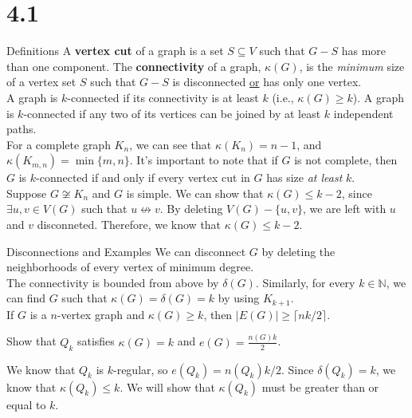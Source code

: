 \documentclass[10pt]{extarticle}
\begin{document}
  \section*{4.1}%
  \begin{problem}{Definitions}
    A \textbf{vertex cut} of a graph is a set $S\subseteq V$ such that $G-S$ has more than one component. The \textbf{connectivity} of a graph, $\kappa(G)$, is the \textit{minimum} size of a vertex set $S$ such that $G-S$ is disconnected \underline{or} has only one vertex.\\

    A graph is $k$-connected if its connectivity is at least $k$ (i.e., $\kappa(G) \geq k$). A graph is $k$-connected if any two of its vertices can be joined by at least $k$ independent paths.\\

    For a complete graph $K_n$, we can see that $\kappa(K_n) = n-1$, and $\kappa(K_{m,n}) = \min\{m,n\}$. It's important to note that if $G$ is not complete, then $G$ is $k$-connected if and only if every vertex cut in $G$ has size \textit{at least} $k$.\\

    Suppose $G \not\cong K_n$ and $G$ is simple. We can show that $\kappa(G) \leq k-2$, since $\exists u,v\in V(G)$ such that $u\not\leftrightarrow v$. By deleting $V(G) - \{u,v\}$, we are left with $u$ and $v$ disconneted. Therefore, we know that $\kappa(G) \leq k-2$.
  \end{problem}
  \begin{problem}{Disconnections and Examples}
    We can disconnect $G$ by deleting the neighborhoods of every vertex of minimum degree.\\

    The connectivity is bounded from above by $\delta(G)$. Similarly, for every $k\in \mathbb{N}$, we can find $G$ such that $\kappa(G) = \delta(G) = k$ by using $K_{k+1}$.\\

    If $G$ is a $n$-vertex graph and $\kappa(G) \geq k$, then $|E(G)| \geq \lceil nk/2\rceil$.\\

    \begin{description}[font=\scshape]
      \item[Ex.] Show that $Q_k$ satisfies $\kappa(G) = k$ and $e(G) = \frac{n(G)k}{2}$.
      \item[Proof] We know that $Q_k$ is $k$-regular, so $e(Q_k) = n(Q_k)k/2$. Since $\delta(Q_k) = k$, we know that $\kappa(Q_k)\leq k$. We will show that $\kappa(Q_k)$ must be greater than or equal to $k$.
    \end{description}
  \end{problem}
\end{document}
